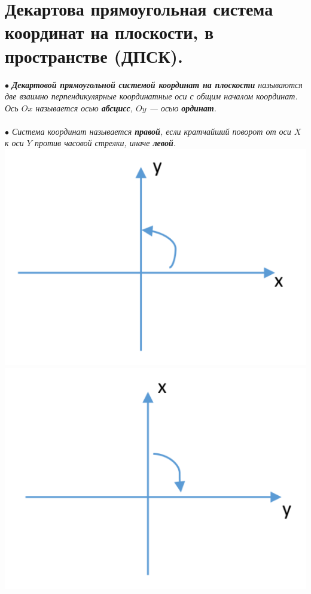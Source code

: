 \section{Декартова прямоугольная система координат на плоскости, в пространстве (ДПСК).}
$\bullet$ \textit{\textbf{Декартовой прямоугольной системой координат на плоскости} называются две взаимно перпендикулярные координатные оси с общим началом координат. Ось $Ox$ называется осью \textbf{абсцисс}, $Oy$ --- осью \textbf{ординат}. \\\\$\bullet$ Система координат называется \textbf{правой}, если кратчайший поворот от оси $X$ к оси $Y$ против часовой стрелки, иначе \textbf{левой}.}\\
\includegraphics[scale=0.3]{images/rdpsk.png} \qquad\qquad\qquad\qquad\qquad \includegraphics[scale=0.3]{images/ldpsk.png}\par
